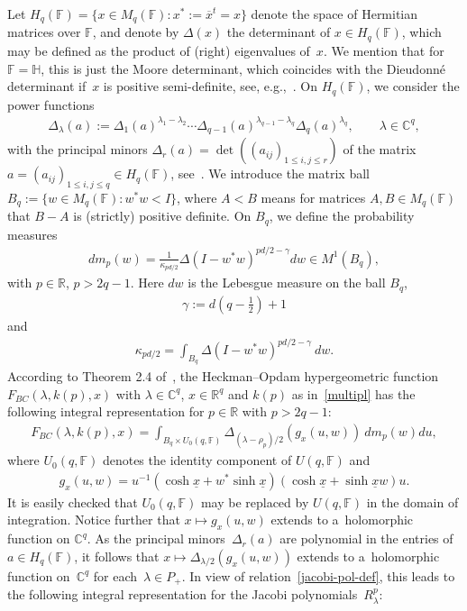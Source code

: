 \documentclass[pdftex]{sigma}
\numberwithin{equation}{section}
\begin{document}
Let $H_q(\mathbb F)=\{x\in M_q(\mathbb F): x^*:= \overline x^t=x\}$ denote the space of Hermitian matrices over
$\mathbb F$, and denote by $\Delta(x)$ the determinant of $x\in H_q(\mathbb F)$, which may be def\/ined as the product of
(right) eigenvalues of~$x$.
We mention that for $\mathbb F=\mathbb H$, this is just the Moore determinant, which coincides with the Dieudonn\'e
determinant if~$x$ is positive semi-def\/inite, see, e.g.,~\cite{A}.
On $H_q(\mathbb F)$, we consider the power functions
\begin{gather*}
\Delta_\lambda(a):= \Delta_1(a)^{\lambda_1-\lambda_2}   \cdots   \Delta_{q-1}(a)^{\lambda_{q-1}-\lambda_q} \Delta_q(a)^{\lambda_{q}},
\qquad
\lambda \in \mathbb C^q,
\end{gather*}
with the principal minors $\Delta_r(a)=\det ((a_{ij})_{1\leq i,j\leq r}) $ of the matrix $a=(a_{ij})_{1\leq i,j\leq
q}\in H_q(\mathbb F)$, see~\cite{FK}.
We introduce the matrix ball $ B_q:= \{w\in M_q(\mathbb F): w^*w < I\}$, where $A<B$ means for matrices $A,B\in
M_q(\mathbb F)$ that $B-A$ is (strictly) positive def\/inite.
On $B_q$, we def\/ine the probability measures
\begin{gather*}
dm_p(w)=\frac{1}{\kappa_{pd/2}} \Delta(I-w^*w)^{pd/2-\gamma}dw
\in M^1(B_q),
\end{gather*}
with $p\in \mathbb R$, $p>2q-1$.
Here $dw$ is the Lebesgue measure on the ball $B_q$,
\begin{gather*}
\gamma:= d\left(q-\frac{1}{2}\right)+1
\end{gather*}
and
\begin{gather*}
\kappa_{pd/2}= \int_{B_q} \Delta(I-w^*w)^{pd/2-\gamma}\> dw.
\end{gather*}
According to Theorem 2.4 of~\cite{RV2}, the Heckman--Opdam hypergeometric function $F_{BC}(\lambda, k(p),x)$ with
$\lambda \in \mathbb C^q$, $x\in \mathbb R^q$ and $k(p)$ as in~\eqref{multipl} has the following integral representation
for $p\in \mathbb R$ with $p>2q-1$:
\begin{gather*}
F_{BC}(\lambda, k(p), x)=\int_{B_q\times U_0(q, \mathbb F)} \Delta_{(\lambda-\rho_p)/2}(g_x(u,w))\> dm_p(w)du,
\end{gather*}
where $U_0(q,\mathbb F)$ denotes the identity component of $U(q, \mathbb F)$ and
\begin{gather*}
g_x(u,w)=u^{-1}(\cosh \underline x+w^* \sinh \underline x)(\cosh \underline x+\sinh\underline x w)u.
\end{gather*}
It is easily checked that $U_0(q, \mathbb F)$ may be replaced by $U(q,\mathbb F)$ in the domain of integration.
Notice further that $x\mapsto g_x(u,w)$ extends to a~holomorphic function on $\mathbb C^q$.
As the principal minors~$\Delta_r(a)$ are polynomial in the entries of $a\in H_q(\mathbb F)$, it follows
that $x\mapsto\Delta_{\lambda/2}(g_x(u,w))$ extends to a~holomorphic function on~$\mathbb C^q$ for each~$\lambda \in P_+$.
In view of relation~\eqref{jacobi-pol-def}, this leads to the following integral representation for the Jacobi
polynomials~$R_\lambda^p$:
\end{document}
